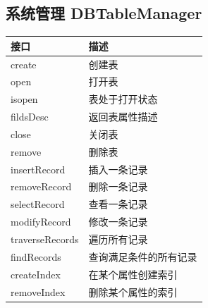     \subsection{系统管理 DBTableManager}
        \begin{tabularx}{\textwidth}{lX}
            \toprule
            接口 & 描述 \\
            \midrule
            create & 创建表 \\
            \midrule
            open & 打开表 \\
            \midrule
            isopen & 表处于打开状态 \\
            \midrule
            fildsDesc & 返回表属性描述 \\
            \midrule
            close & 关闭表 \\
            \midrule
            remove & 删除表 \\
            \midrule
            insertRecord & 插入一条记录 \\
            \midrule
            removeRecord & 删除一条记录 \\
            \midrule
            selectRecord & 查看一条记录 \\
            \midrule
            modifyRecord & 修改一条记录 \\
            \midrule
            traverseRecords & 遍历所有记录 \\
            \midrule
            findRecords & 查询满足条件的所有记录 \\
            \midrule 
            createIndex & 在某个属性创建索引 \\
            \midrule
            removeIndex & 删除某个属性的索引 \\
            \bottomrule
        \end{tabularx}
